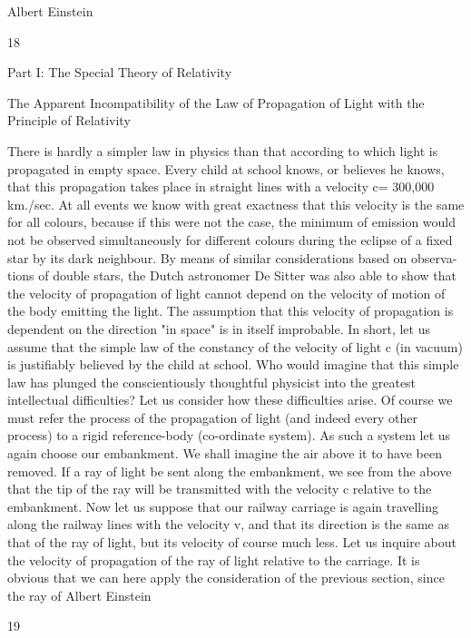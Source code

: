 \documentclass{article}
\begin{document}
Albert Einstein

18

Part I: The Special Theory of Relativity

The Apparent Incompatibility of
the Law of Propagation of Light
with the Principle of Relativity

There is hardly a simpler law in physics than that according to which light is propagated
in empty space. Every child at school knows, or believes he knows, that this propagation
takes place in straight lines with a velocity c= 300,000 km./sec. At all events we know with
great exactness that this velocity is the same for all colours, because if this were not the
case, the minimum of emission would not be observed simultaneously for different colours
during the eclipse of a fixed star by its dark neighbour. By means of similar considerations
based on observa- tions of double stars, the Dutch astronomer De Sitter was also able to
show that the velocity of propagation of light cannot depend on the velocity of motion of
the body emitting the light. The assumption that this velocity of propagation is dependent
on the direction "in space" is in itself improbable.
In short, let us assume that the simple law of the constancy of the velocity of light c (in
vacuum) is justifiably believed by the child at school. Who would imagine that this simple
law has plunged the conscientiously thoughtful physicist into the greatest intellectual
difficulties? Let us consider how these difficulties arise.
Of course we must refer the process of the propagation of light (and indeed every other
process) to a rigid reference-body (co-ordinate system). As such a system let us again
choose our embankment. We shall imagine the air above it to have been removed. If a ray
of light be sent along the embankment, we see from the above that the tip of the ray will be
transmitted with the velocity c relative to the embankment. Now let us suppose that our
railway carriage is again travelling along the railway lines with the velocity v, and that its
direction is the same as that of the ray of light, but its velocity of course much less. Let us
inquire about the velocity of propagation of the ray of light relative to the carriage. It is
obvious that we can here apply the consideration of the previous section, since the ray of
Albert Einstein

19
\end{document}
